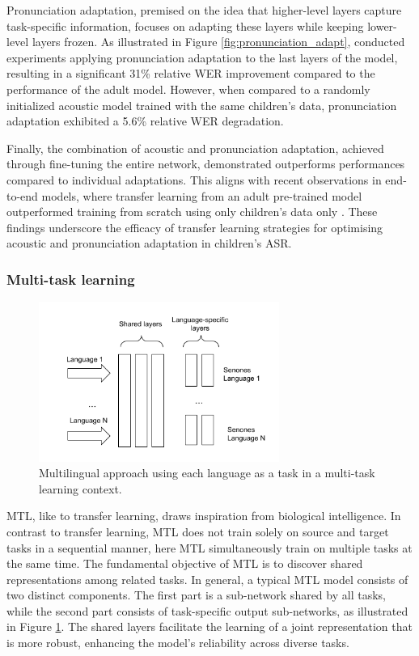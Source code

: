 Pronunciation adaptation, premised on the idea that higher-level layers capture task-specific information, focuses on adapting these layers while keeping lower-level layers frozen. As illustrated in Figure \ref{fig:pronunciation_adapt}, \cite{TFchildren} conducted experiments applying pronunciation adaptation to the last layers of the model, resulting in a significant 31\% relative \ac{WER} improvement compared to the performance of the adult model. However, when compared to a randomly initialized acoustic model trained with the same children's data, pronunciation adaptation exhibited a 5.6\% relative \ac{WER} degradation.

Finally, the combination of acoustic and pronunciation adaptation, achieved through fine-tuning the entire network, demonstrated outperforms performances compared to individual adaptations. This aligns with recent observations in end-to-end models, where transfer learning from an adult pre-trained model outperformed training from scratch using only children's data only \cite{sri_end2end, gelin2021endtoend}. These findings underscore the efficacy of transfer learning strategies for optimising acoustic and pronunciation adaptation in children's \ac{ASR}. 

\subsubsection{Multi-task learning}%
\label{section:MTL}
\begin{figure}[t]
\begin{center}
\includegraphics[width=0.7\textwidth]{imgs/MTL.png}
\caption{Multilingual approach using each language as a task in a multi-task learning context.}
\label{fig:MTL}
\end{center}
\end{figure}

\ac{MTL}, like to transfer learning, draws inspiration from biological intelligence. In contrast to transfer learning, \ac{MTL} does not train solely on source and target tasks in a sequential manner, here \ac{MTL} simultaneously train on multiple tasks at the same time. The fundamental objective of \ac{MTL} is to discover shared representations among related tasks.  In general, a typical \ac{MTL} model consists of two distinct components. The first part is a sub-network shared by all tasks, while the second part consists of task-specific output sub-networks, as illustrated in Figure \ref{fig:MTL}. The shared layers facilitate the learning of a joint representation that is more robust, enhancing the model's reliability across diverse tasks.

